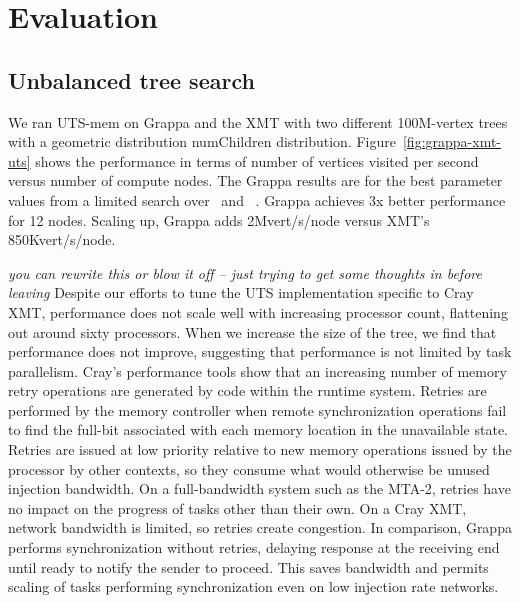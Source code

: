 \section{Evaluation} \label{sec:evaluation}

\subsection{Unbalanced tree search}

We ran UTS-mem on Grappa and the XMT with two different 100M-vertex trees with a geometric distribution numChildren distribution. Figure~\ref{fig:grappa-xmt-uts} shows the performance in terms of number of vertices visited per second versus number of compute nodes. The Grappa results are for the best parameter values from a limited search over \flushtimeout~and \asyncforthr~. Grappa achieves 3x better performance for 12 nodes. Scaling up, Grappa adds 2Mvert/s/node versus XMT's 850Kvert/s/node.




{\em you can rewrite this or blow it off -- just trying to get some thoughts in before leaving}
Despite our efforts to tune the UTS implementation specific to Cray XMT, performance does not scale well with increasing processor count, flattening out around sixty processors.  When we increase the size of the tree, we find that performance does not improve, suggesting that performance is not limited by task parallelism.   Cray's performance tools show that an increasing number of memory retry operations are generated by code within the runtime system.  Retries are performed by the memory controller when remote synchronization operations fail to find the full-bit associated with each memory location in the unavailable state.  Retries are issued at low priority relative to new memory operations issued by the processor by other contexts, so they consume what would otherwise be unused injection bandwidth.  On a full-bandwidth system such as the MTA-2, retries have no impact on the progress of tasks other than their own.  On a Cray XMT, network bandwidth is limited, so retries create congestion.  In comparison, Grappa performs synchronization without retries, delaying response at the receiving end until ready to notify the sender to proceed.  This saves bandwidth and permits scaling of tasks performing synchronization even on low injection rate networks.


